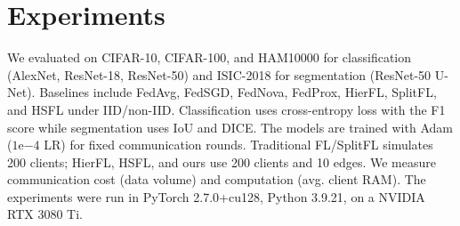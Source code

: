 \documentclass[letterpaper]{article} %
\begin{document}
\section{Experiments}
    We evaluated on CIFAR-10, CIFAR-100, and HAM10000 for classification (AlexNet, ResNet-18, ResNet-50) and ISIC-2018 for segmentation (ResNet-50 U-Net). Baselines include FedAvg, FedSGD, FedNova, FedProx, HierFL, SplitFL, and HSFL under IID/non-IID. Classification uses cross-entropy loss with the F1 score while segmentation uses IoU and DICE. The models are trained with Adam ($1\mathrm{e}{-4}$ LR) for fixed communication rounds. Traditional FL/SplitFL simulates 200 clients; HierFL, HSFL, and ours use 200 clients and 10 edges. We measure communication cost (data volume) and computation (avg. client RAM). The experiments were run in PyTorch 2.7.0+cu128, Python 3.9.21, on a NVIDIA RTX 3080 Ti.
\end{document}
